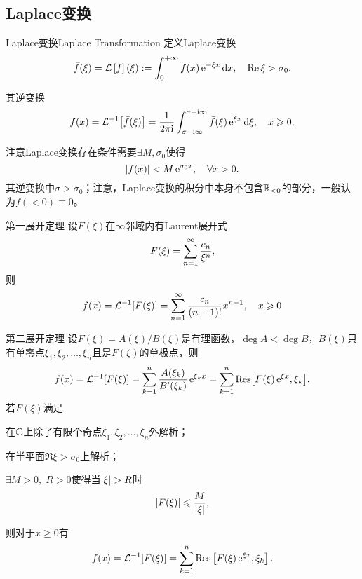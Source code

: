 \subsection{Laplace变换}
\begin{definition}{Laplace变换}{Laplace Transformation}
	定义Laplace变换
	\[
		\bar f(\xi)=\cl f(\xi):=\int\zti f(x)\e{-\xi x}\d x,\quad\Re\xi>\sigma_0.
	\]
	
	其逆变换
	\[
		f(x)=\cli{\bar f(\xi)}=\frac1{2\pi\i}\int_{\sigma-\i\infty}^{\sigma+\i\infty}\bar f(\xi)\e{\xi x}\d\xi,\quad x\geqslant 0.
	\]
\end{definition}
注意Laplace变换存在条件需要$\exists M,\sigma_0$使得
	\[
		\abs{f(x)}<M\e{\sigma_0x},\quad\forall x>0.
	\]
其逆变换中$\sigma>\sigma_0$；注意，Laplace变换的积分中本身不包含$\RR_{<0}$的部分，一般认为$f(<0)\equiv 0$。
\begin{theorem}{第一展开定理}{}
	设$F(\xi)$在$\infty$邻域内有Laurent展开式
	\[
		F(\xi)=\sum\fmto n1\frac{c_n}{\xi^n},
	\]
	则
	\[
		f(x)=\cli{F(\xi)}=\sum\fmto n1\frac{c_n}{(n-1)!}x^{n-1},\quad x\geqslant 0
	\]
\end{theorem}
\begin{theorem}{第二展开定理}{}
	设$F(\xi)=A(\xi)/B(\xi)$是有理函数，$\deg A<\deg B$，$B(\xi)$只有单零点$\xi_1,\xi_2,\ldots,\xi_n$且是$F(\xi)$的单极点，则
	\[
		f(x)=\cli{F(\xi)}=\sum\fmto[n]k1\frac{A(\xi_k)}{B'(\xi_k)}\e{\xi_kx}=\sum\fmto[n]k1\Res\bigfkh{F(\xi)\e{\xi x},\xi_k}.
	\]
\tcblower
	若$F(\xi)$满足
	\begin{compactenum}
		\item 在$\CC$上除了有限个奇点$\xi_1,\xi_2,\ldots,\xi_n$外解析；
		\item 在半平面$\Re\xi>\sigma_0$上解析；
		\item $\exists M>0,\;R>0$使得当$\abs\xi>R$时
		\[
			\abs{F(\xi)}\leqslant\frac M{\abs\xi},
		\]
	\end{compactenum}
	则对于$x\geqslant 0$有
	\[
		f(x)=\cli{F(\xi)}=\sum\fmto[n]k1\Res\fkh{F(\xi)\e{\xi x},\xi_k}.
	\]
\end{theorem}
